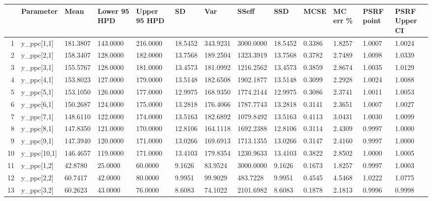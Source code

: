 \begin{table}[ht]
\centering
\begin{tabular}{rllllllllllll}
  \hline
 & Parameter & Mean & Lower 95 HPD & Upper 95 HPD & SD & Var & SSeff & SSD & MCSE & MC err \% & PSRF point & PSRF Upper CI \\ 
  \hline
1 & y\_ppc[1,1] & 181.3807 & 143.0000 & 216.0000 & 18.5452 & 343.9231 & 3000.0000 & 18.5452 & 0.3386 & 1.8257 & 1.0007 & 1.0024 \\ 
  2 & y\_ppc[2,1] & 158.3407 & 128.0000 & 182.0000 & 13.7568 & 189.2504 & 1323.3919 & 13.7568 & 0.3782 & 2.7489 & 1.0098 & 1.0339 \\ 
  3 & y\_ppc[3,1] & 155.5767 & 128.0000 & 181.0000 & 13.4573 & 181.0992 & 1216.2562 & 13.4573 & 0.3859 & 2.8674 & 1.0035 & 1.0129 \\ 
  4 & y\_ppc[4,1] & 153.8023 & 127.0000 & 179.0000 & 13.5148 & 182.6508 & 1902.1877 & 13.5148 & 0.3099 & 2.2928 & 1.0024 & 1.0088 \\ 
  5 & y\_ppc[5,1] & 153.1050 & 126.0000 & 177.0000 & 12.9975 & 168.9350 & 1774.2144 & 12.9975 & 0.3086 & 2.3741 & 1.0011 & 1.0053 \\ 
  6 & y\_ppc[6,1] & 150.2687 & 124.0000 & 175.0000 & 13.2818 & 176.4066 & 1787.7743 & 13.2818 & 0.3141 & 2.3651 & 1.0007 & 1.0027 \\ 
  7 & y\_ppc[7,1] & 148.6110 & 122.0000 & 174.0000 & 13.5163 & 182.6892 & 1079.8492 & 13.5163 & 0.4113 & 3.0431 & 1.0030 & 1.0099 \\ 
  8 & y\_ppc[8,1] & 147.8350 & 121.0000 & 170.0000 & 12.8106 & 164.1118 & 1692.2388 & 12.8106 & 0.3114 & 2.4309 & 0.9997 & 1.0000 \\ 
  9 & y\_ppc[9,1] & 147.3940 & 120.0000 & 171.0000 & 13.0266 & 169.6913 & 1713.1355 & 13.0266 & 0.3147 & 2.4160 & 0.9997 & 1.0000 \\ 
  10 & y\_ppc[10,1] & 146.4657 & 119.0000 & 171.0000 & 13.4103 & 179.8354 & 1230.9633 & 13.4103 & 0.3822 & 2.8502 & 1.0000 & 1.0005 \\ 
  11 & y\_ppc[1,2] &  42.8780 &  25.0000 &  60.0000 &  9.1626 &  83.9524 & 3000.0000 &  9.1626 & 0.1673 & 1.8257 & 0.9997 & 1.0003 \\ 
  12 & y\_ppc[2,2] &  60.7417 &  42.0000 &  80.0000 &  9.9951 &  99.9029 &  483.7228 &  9.9951 & 0.4545 & 4.5468 & 1.0222 & 1.0775 \\ 
  13 & y\_ppc[3,2] &  60.2623 &  43.0000 &  76.0000 &  8.6083 &  74.1022 & 2101.6982 &  8.6083 & 0.1878 & 2.1813 & 0.9996 & 0.9998 \\ 

\end{tabular}
\end{table}
